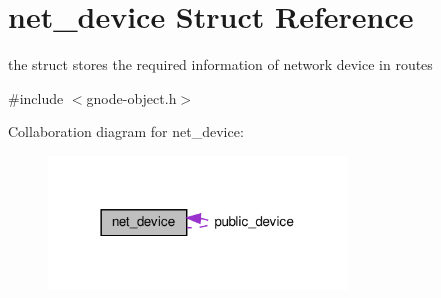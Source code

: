 \hypertarget{structnet__device}{}\section{net\+\_\+device Struct Reference}
\label{structnet__device}


the struct stores the required information of network device in routes  




{\ttfamily \#include $<$gnode-\/object.\+h$>$}



Collaboration diagram for net\+\_\+device\+:\nopagebreak
\begin{figure}[H]
\begin{center}
\leavevmode
\includegraphics[width=225pt]{structnet__device__coll__graph}
\end{center}
\end{figure}
